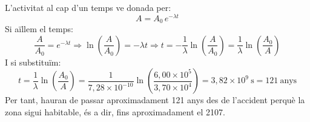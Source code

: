 \begin{solapartat}
 L'activitat al cap d'un temps ve donada per:
\[ A = A_0\,e^{-\lambda t} \]
Si aïllem el temps:
\[ \frac{A}{A_0} = e^{-\lambda t} \Longrightarrow \ln\left(\frac{A}{A_0}\right) = -\lambda t \Longrightarrow t = -\frac{1}{\lambda}\ln\left(\frac{A}{A_0}\right) = \frac{1}{\lambda}\ln\left(\frac{A_0}{A}\right) \]
 I si substituïm:
\[ t = \frac{1}{\lambda}\ln\left(\frac{A_0}{A}\right) = \frac{1}{7,28\times 10^{-10}}\ln\left(\frac{6,00\times 10^{5}}{3,70\times 10^{4}}\right) = 3,82\times 10^{9}\ \mathrm{s} = 121\ \text{anys} \]
 Per tant, hauran de passar aproximadament 121 anys des de l'accident perquè la zona sigui habitable, és a dir, fins aproximadament el 2107.
\end{solapartat}
